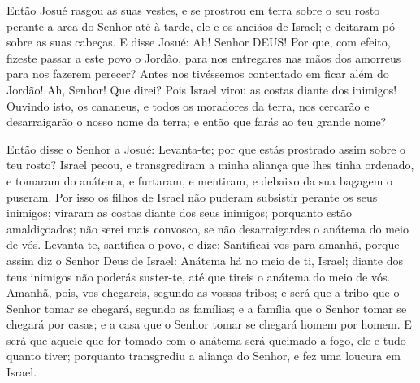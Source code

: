Então Josué rasgou as suas vestes, e se prostrou em terra sobre o
seu rosto perante a arca do Senhor até à tarde, ele e os anciãos de
Israel; e deitaram pó sobre as suas cabeças. E disse Josué: Ah!
Senhor DEUS! Por que, com efeito, fizeste passar a este povo o
Jordão, para nos entregares nas mãos dos amorreus para nos fazerem
perecer? Antes nos tivéssemos contentado em ficar além do Jordão!
Ah, Senhor! Que direi? Pois Israel virou as costas diante dos
inimigos! Ouvindo isto, os cananeus, e todos os moradores da
terra, nos cercarão e desarraigarão o nosso nome da terra; e então
que farás ao teu grande nome?

Então disse o Senhor a Josué: Levanta-te; por que estás prostrado
assim sobre o teu rosto? Israel pecou, e transgrediram a
minha aliança que lhes tinha ordenado, e tomaram do anátema, e
furtaram, e mentiram, e debaixo da sua bagagem o puseram. Por
isso os filhos de Israel não puderam subsistir perante os seus
inimigos; viraram as costas diante dos seus inimigos; porquanto
estão amaldiçoados; não serei mais convosco, se não desarraigardes o
anátema do meio de vós. Levanta-te, santifica o povo, e dize:
Santificai-vos para amanhã, porque assim diz o Senhor Deus de
Israel: Anátema há no meio de ti, Israel; diante dos teus inimigos
não poderás suster-te, até que tireis o anátema do meio de vós.
Amanhã, pois, vos chegareis, segundo as vossas tribos; e será
que a tribo que o Senhor tomar se chegará, segundo as famílias; e a
família que o Senhor tomar se chegará por casas; e a casa que o
Senhor tomar se chegará homem por homem. E será que aquele
que for tomado com o anátema será queimado a fogo, ele e tudo quanto
tiver; porquanto transgrediu a aliança do Senhor, e fez uma loucura
em Israel.

